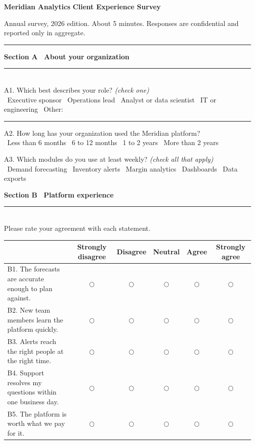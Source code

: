 \documentclass[10pt]{article}
\newcommand{\cb}{\raisebox{-1pt}{\large$\square$}\ }
\newcommand{\lik}{$\bigcirc$}
\newcommand{\sectionhead}[1]{%
  \vspace{12pt}
  {\large\bfseries\color{accent}#1}\\[-4pt]
  {\color{accent}\rule{\linewidth}{1pt}}\\[6pt]}
\begin{document}
{\LARGE\bfseries\color{accent}Meridian Analytics}\hfill
{\large\bfseries Client Experience Survey}

\vspace{2pt}
{\color{inkgray}\small Annual survey, 2026 edition. About 5 minutes.
Responses are confidential and reported only in aggregate.}

\vspace{6pt}
{\color{accent}\rule{\linewidth}{2pt}}

\sectionhead{Section A \, About your organization}

A1. Which best describes your role? \textit{(check one)}\\[4pt]
\cb Executive sponsor \hfill \cb Operations lead \hfill
\cb Analyst or data scientist \hfill \cb IT or engineering \hfill
\cb Other: \rule{2.8cm}{0.4pt}

\vspace{8pt}
A2. How long has your organization used the Meridian platform?\\[4pt]
\cb Less than 6 months \hfill \cb 6 to 12 months \hfill
\cb 1 to 2 years \hfill \cb More than 2 years

\vspace{8pt}
A3. Which modules do you use at least weekly? \textit{(check all that apply)}\\[4pt]
\cb Demand forecasting \hfill \cb Inventory alerts \hfill
\cb Margin analytics \hfill \cb Dashboards \hfill \cb Data exports

\sectionhead{Section B \, Platform experience}

Please rate your agreement with each statement.

\vspace{4pt}
\begin{tabularx}{\textwidth}{@{}XCCCCC@{}}
  \toprule
  & {\scriptsize\bfseries Strongly disagree} & {\scriptsize\bfseries Disagree}
  & {\scriptsize\bfseries Neutral} & {\scriptsize\bfseries Agree}
  & {\scriptsize\bfseries Strongly agree}\\
  \midrule
  B1. The forecasts are accurate enough to plan against. & \lik & \lik & \lik & \lik & \lik\\
  B2. New team members learn the platform quickly. & \lik & \lik & \lik & \lik & \lik\\
  B3. Alerts reach the right people at the right time. & \lik & \lik & \lik & \lik & \lik\\
  B4. Support resolves my questions within one business day. & \lik & \lik & \lik & \lik & \lik\\
  B5. The platform is worth what we pay for it. & \lik & \lik & \lik & \lik & \lik\\
  \bottomrule
\end{tabularx}
\end{document}
